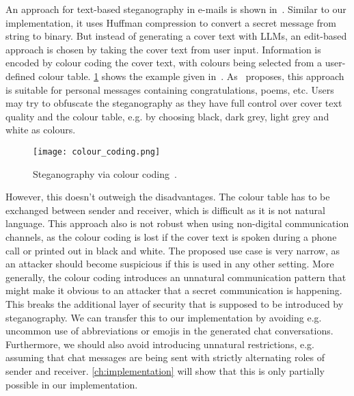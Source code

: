 An approach for text-based steganography in e-mails is shown in~\cite{malikHighCapacityText2017}. Similar to our implementation, it uses Huffman compression to convert a secret message from string to binary. But instead of generating a cover text with \glspl{LLM}, an edit-based approach is chosen by taking the cover text from user input. Information is encoded by colour coding the cover text, with colours being selected from a user-defined colour table. \cref{fig:colourCoding} shows the example given in~\cite{malikHighCapacityText2017}. As~\cite{malikHighCapacityText2017} proposes, this approach is suitable for personal messages containing congratulations, poems, etc. Users may try to obfuscate the steganography as they have full control over cover text quality and the colour table, e.g. by choosing black, dark grey, light grey and white as colours.

\begin{figure}
    \begin{wide}
        \centering
        \captionsetup{width=\linewidth}
        \texttt{[image: colour\_coding.png]}
        \caption[Colour coding]{Steganography via colour coding~\cite{malikHighCapacityText2017}.}
        \label{fig:colourCoding}
    \end{wide}
\end{figure}

However, this doesn't outweigh the disadvantages. The colour table has to be exchanged between sender and receiver, which is difficult as it is not natural language. This approach also is not robust when using non-digital communication channels, as the colour coding is lost if the cover text is spoken during a phone call or printed out in black and white. The proposed use case is very narrow, as an attacker should become suspicious if this is used in any other setting. More generally, the colour coding introduces an unnatural communication pattern that might make it obvious to an attacker that a secret communication is happening. This breaks the additional layer of security that is supposed to be introduced by steganography. We can transfer this to our implementation by avoiding e.g. uncommon use of abbreviations or emojis in the generated chat conversations. Furthermore, we should also avoid introducing unnatural restrictions, e.g. assuming that chat messages are being sent with strictly alternating roles of sender and receiver. \cref{ch:implementation} will show that this is only partially possible in our implementation.

